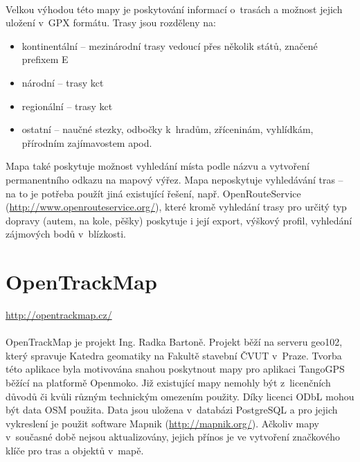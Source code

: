 \documentclass[11pt,a4paper,titlepage,oneside]{book}
\begin{document}
		\paragraph{} Velkou výhodou této mapy je poskytování informací o~trasách a možnost jejich uložení v~\ac{GPX} formátu. Trasy jsou rozděleny na:
	\begin{itemize}
		 \item kontinentální -- mezinárodní trasy vedoucí přes několik států, značené prefixem E
		 \item národní -- trasy \ac{kct}
		 \item regionální -- trasy \ac{kct}
     		 \item ostatní -- naučné stezky, odbočky k~hradům, zříceninám, vyhlídkám, přírodním zajímavostem apod.
	\end{itemize}
  Mapa také poskytuje možnost vyhledání místa podle názvu a vytvoření permanentního odkazu na mapový výřez. Mapa neposkytuje vyhledávání tras -- na to je potřeba použít jiná existující řešení, např. OpenRouteService (\url{http://www.openrouteservice.org/}), které kromě vyhledání trasy pro určitý typ dopravy (autem, na kole, pěšky) poskytuje i její export, výškový profil, vyhledání zájmových bodů v~blízkosti.

 	\section{OpenTrackMap}
		\url{http://opentrackmap.cz/}

                

		\paragraph{} OpenTrackMap je projekt Ing. Radka Bartoně. Projekt běží na serveru geo102, který spravuje Katedra geomatiky na Fakultě stavební ČVUT v~Praze. Tvorba této aplikace byla motivována snahou poskytnout mapy pro aplikaci TangoGPS běžící na platformě Openmoko\cite{OTM}. Již existující mapy nemohly být z~licenčních důvodů či kvůli různým technickým omezením použity. Díky licenci \ac{ODbL} mohou být data \ac{OSM} použita. Data jsou uložena v~databázi PostgreSQL a pro jejich vykreslení je použit software Mapnik (\url{http://mapnik.org/}). Ačkoliv mapy v~současné době nejsou aktualizovány, jejich přínos je ve vytvoření značkového klíče pro tras a objektů v~mapě\cite{otm_klic}. 
\end{document}
